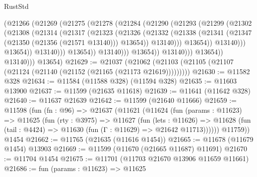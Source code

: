 \begin{lexlean}{RustStd}
\begin{coremodule}
                              (@21266
                                (@21269
                                  (@21275
                                    (@21278
                                      (@21284
                                        (@21290
                                          (@21293
                                            (@21299
                                              (@21302
                                                (@21308
                                                  (@21314
                                                    (@21317
                                                      (@21323
                                                        (@21326
                                                          (@21332
                                                            (@21338
                                                              (@21341
                                                                (@21347
                                                                  (@21350 (@21356 (@21571 @13140)))
                                                                  @13654))
                                                              @13140)))
                                                        @13654))
                                                    @13140)))
                                              @13654))
                                          @13140)))
                                    @13654))
                                @13140)))
                          @13654))
                      @13140)))
                @13654))
            @13140)))
      @13654)
@21629 := @21037
    (@21062 (@21103 (@21105 (@21107 (@21124 (@21140 (@21152 (@21165 (@21173 @21619)))))))))
@21630 := @11582 @328
@21634 := @11584 (@11588 @328) (@11594 @328)
@21635 := @11603 @13900
@21637 := @11599 (@21635 @11618)
@21639 := @11641 (@11642 @328)
@21640 := @11637 @21639
@21642 := @11599 (@21640 @11666)
@21659 := @11598
    (fun (fn : @96) =>
    @21637
      (@11621
        (@11624
          (fun (params : @11623) =>
          @11625
            (fun (rty : @3975) =>
            @11627
              (fun (lets : @11626) =>
              @11628 (fun (tail : @4424) => @11630 (fun (Γ : @11629) => @21642 @11713))))))
        @11759))
    @1454
@21662 := @11765 (@21635 (@11616 @1454))
@21665 := @11678 (@11679 @1454) @13903
@21669 := @11599 (@11670 (@21665 @11687) @11691)
@21670 := @11704 @1454
@21675 := @11701 (@11703 @21670 @13906 @11659 @11661)
@21686 := fun (params : @11623) =>
  @11625

\end{coremodule}
\end{lexlean}
